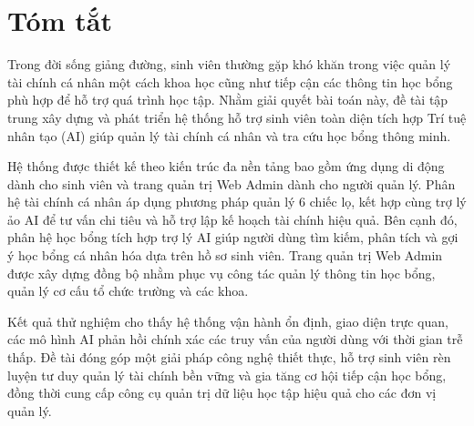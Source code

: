 \chapter*{Tóm tắt}
\label{summary}

Trong đời sống giảng đường, sinh viên thường gặp khó khăn trong việc quản lý tài chính cá nhân một cách khoa học cũng như tiếp cận các thông tin học bổng phù hợp để hỗ trợ quá trình học tập. Nhằm giải quyết bài toán này, đề tài tập trung xây dựng và phát triển hệ thống hỗ trợ sinh viên toàn diện tích hợp Trí tuệ nhân tạo (AI) giúp quản lý tài chính cá nhân và tra cứu học bổng thông minh.

Hệ thống được thiết kế theo kiến trúc đa nền tảng bao gồm ứng dụng di động dành cho sinh viên và trang quản trị Web Admin dành cho người quản lý. Phân hệ tài chính cá nhân áp dụng phương pháp quản lý 6 chiếc lọ, kết hợp cùng trợ lý ảo AI để tư vấn chi tiêu và hỗ trợ lập kế hoạch tài chính hiệu quả. Bên cạnh đó, phân hệ học bổng tích hợp trợ lý AI giúp người dùng tìm kiếm, phân tích và gợi ý học bổng cá nhân hóa dựa trên hồ sơ sinh viên. Trang quản trị Web Admin được xây dựng đồng bộ nhằm phục vụ công tác quản lý thông tin học bổng, quản lý cơ cấu tổ chức trường và các khoa.

Kết quả thử nghiệm cho thấy hệ thống vận hành ổn định, giao diện trực quan, các mô hình AI phản hồi chính xác các truy vấn của người dùng với thời gian trễ thấp. Đề tài đóng góp một giải pháp công nghệ thiết thực, hỗ trợ sinh viên rèn luyện tư duy quản lý tài chính bền vững và gia tăng cơ hội tiếp cận học bổng, đồng thời cung cấp công cụ quản trị dữ liệu học tập hiệu quả cho các đơn vị quản lý.